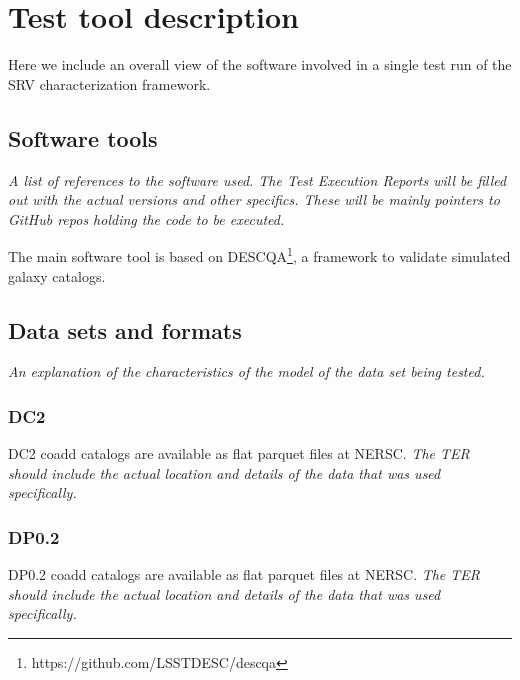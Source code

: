 \documentclass[11pt, a4paper]{article}
\begin{document}

\section{Test tool description}

Here we include an overall view of the software involved in a single test run of the SRV characterization framework.

\subsection{Software tools}

\textit{A list of references to the software used. The Test Execution Reports will be filled out with the actual versions and other specifics. These will be mainly pointers to GitHub repos holding the code to be executed.}

The main software tool is based on DESCQA\footnote{https://github.com/LSSTDESC/descqa}, a framework to validate simulated galaxy catalogs. 

\subsection{Data sets and formats}

\textit{An explanation of the characteristics of the model of the data set being tested.}

\subsubsection{DC2}

DC2 coadd catalogs are available as flat parquet files at NERSC. \textit{The TER should include the actual location and details of the data that was used specifically.}

\subsubsection{DP0.2}

DP0.2 coadd catalogs are available as flat parquet files at NERSC. \textit{The TER should include the actual location and details of the data that was used specifically.}

\end{document}
